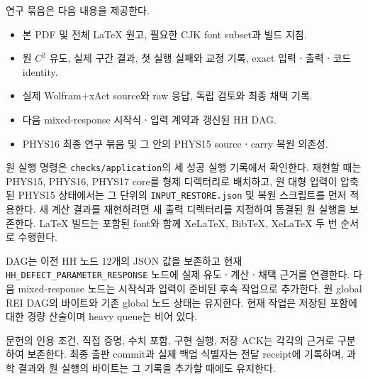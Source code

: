 연구 묶음은 다음 내용을 제공한다.
\begin{itemize}
\item 본 PDF 및 전체 LaTeX 원고, 필요한 CJK font subset과 빌드 지침.
\item 원 $C^2$ 유도, 실제 구간 결과, 첫 실행 실패와 교정 기록, exact 입력ㆍ출력ㆍ코드 identity.
\item 실제 Wolfram+xAct source와 raw 응답, 독립 검토와 최종 채택 기록.
\item 다음 mixed-response 시작식ㆍ입력 계약과 갱신된 HH DAG.
\item PHYS16 최종 연구 묶음 및 그 안의 PHYS15 sourceㆍcarry 복원 의존성.
\end{itemize}
원 실행 명령은 \texttt{checks/application}의 세 성공 실행 기록에서 확인한다. 재현할 때는 PHYS15, PHYS16, PHYS17 core를 형제 디렉터리로 배치하고, 원 대형 입력이 압축된 PHYS15 상태에서는 그 단위의 \texttt{INPUT\_RESTORE.json} 및 복원 스크립트를 먼저 적용한다. 새 계산 결과를 재현하려면 새 출력 디렉터리를 지정하여 동결된 원 실행을 보존한다. LaTeX 빌드는 포함된 font와 함께 XeLaTeX, BibTeX, XeLaTeX 두 번 순서로 수행한다.

DAG는 이전 HH 노드 12개의 JSON 값을 보존하고 현재 \texttt{HH\_DEFECT\_PARAMETER\_RESPONSE} 노드에 실제 유도ㆍ계산ㆍ채택 근거를 연결한다. 다음 mixed-response 노드는 시작식과 입력이 준비된 후속 작업으로 추가한다. 원 global REI DAG의 바이트와 기존 global 노드 상태는 유지한다. 현재 작업은 저장된 포함에 대한 경량 산술이며 heavy queue는 비어 있다.

문헌의 인용 조건, 직접 증명, 수치 포함, 구현 실행, 저장 ACK는 각각의 근거로 구분하여 보존한다. 최종 출판 commit과 실제 백업 식별자는 전달 receipt에 기록하며, 과학 결과와 원 실행의 바이트는 그 기록을 추가할 때에도 유지한다.
